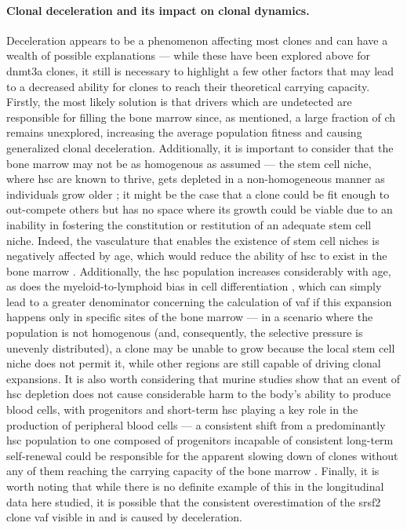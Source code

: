 \paragraph{Clonal deceleration and its impact on clonal dynamics.} Deceleration appears to be a phenomenon affecting most clones and can have a wealth of possible explanations --- while these have been explored above for \ac{dnmt3a} clones, it still is necessary to highlight a few other factors that may lead to a decreased ability for clones to reach their theoretical carrying capacity. Firstly, the most likely solution is that drivers which are undetected are responsible for filling the bone marrow since, as mentioned, a large fraction of \ac{ch} remains unexplored, increasing the average population fitness and causing generalized clonal deceleration. Additionally, it is important to consider that the bone marrow may not be as homogenous as assumed --- the stem cell niche, where \ac{hsc} are known to thrive, gets depleted in a non-homogeneous manner as individuals grow older \cite{Crane2017-hl}; it might be the case that a clone could be fit enough to out-compete others but has no space where its growth could be viable due to an inability in fostering the constitution or restitution of an adequate stem cell niche. Indeed, the vasculature that enables the existence of stem cell niches is negatively affected by age, which would reduce the ability of \ac{hsc} to exist in the bone marrow \cite{Tanaka2017-pu,Wang2017-rg}. Additionally, the \ac{hsc} population increases considerably with age, as does the myeloid-to-lymphoid bias in cell differentiation \cite{Pang2011-dw}, which can simply lead to a greater denominator concerning the calculation of \ac{vaf} if this expansion happens only in specific sites of the bone marrow --- in a scenario where the population is not homogenous (and, consequently, the selective pressure is unevenly distributed), a clone may be unable to grow because the local stem cell niche does not permit it, while other regions are still capable of driving clonal expansions. It is also worth considering that murine studies show that an event of \ac{hsc} depletion does not cause considerable harm to the body's ability to produce blood cells, with progenitors and short-term \ac{hsc} playing a key role in the production of peripheral blood cells --- a consistent shift from a predominantly \ac{hsc} population to one composed of progenitors incapable of consistent long-term self-renewal could be responsible for the apparent slowing down of clones without any of them reaching the carrying capacity of the bone marrow \cite{Schoedel2016-bi,Mitchell2021-zl}. Finally, it is worth noting that while there is no definite example of this in the longitudinal data here studied, it is possible that the consistent overestimation of the \ac{srsf2} clone \ac{vaf} visible in  and  is caused by deceleration.

